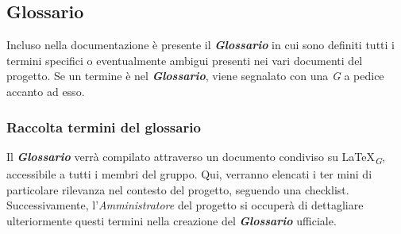 \subsection{Glossario}
Incluso nella documentazione è presente il \textbf{\textit{Glossario}} in cui sono definiti tutti i termini specifici o eventualmente ambigui presenti nei vari documenti del progetto. Se un termine è nel \textbf{\textit{Glossario}}, viene segnalato con una \textit{G} a pedice accanto ad esso.

\subsubsection{Raccolta termini del glossario}
Il \textbf{\textit{Glossario}} verrà compilato attraverso un documento condiviso su \LaTeX \textsubscript{\textit{G}}, accessibile a tutti i membri del gruppo. Qui, verranno elencati i ter mini di particolare rilevanza nel contesto del progetto, seguendo una checklist.  Successivamente, l'\textit{Amministratore} del progetto si occuperà di dettagliare  ulteriormente questi termini nella creazione del \textbf{\textit{Glossario}} ufficiale. 